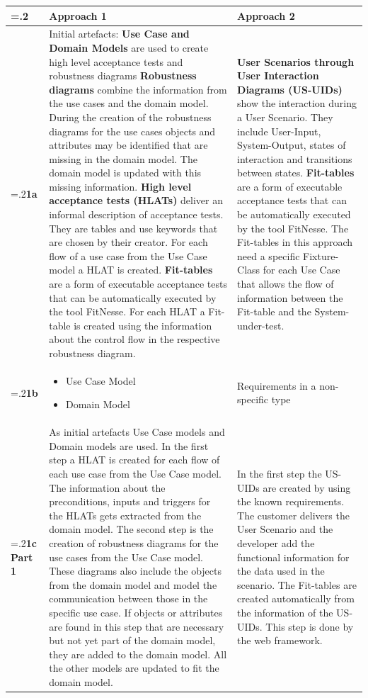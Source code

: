 	\begin{tabularx}{\textwidth}{>{\hsize=.2\hsize}X|X|X}
  		 & \textbf{Approach 1} & \textbf{Approach 2} \\
  		\hline
  		 \textbf{1a} & Initial artefacts: \textbf{Use Case and Domain Models} are used to create high level acceptance tests and robustness diagrams 
\textbf{Robustness diagrams} combine the information from the use cases and the domain model. During the creation of the robustness diagrams for the use cases objects and attributes may be identified that are missing in the domain model. The domain model is updated with this missing information.
\textbf{High level acceptance tests (HLATs)} deliver an informal description of acceptance tests. They are tables and use keywords that are chosen by their creator. For each flow of a use case from the Use Case model a HLAT is created.
\textbf{Fit-tables} are a form of executable acceptance tests that can be automatically executed by the tool FitNesse. For each HLAT a Fit-table is created using the information about the control flow in the respective robustness diagram.
 & \textbf{User Scenarios through User Interaction Diagrams (US-UIDs)} show the interaction during a User Scenario. They include User-Input, System-Output, states of interaction and transitions between states.
\textbf{Fit-tables} are a form of executable acceptance tests that can be automatically executed by the tool FitNesse. The Fit-tables in this approach need a specific Fixture-Class for each Use Case that allows the flow of information between the Fit-table and the System-under-test.
 \\
 
  		 \textbf{1b} & \begin{itemize}
  		 \item Use Case Model \item Domain Model
\end{itemize}  		  & Requirements in a non-specific type \\
  		 \textbf{1c Part 1} & As initial artefacts Use Case models and Domain models are used.
In the first step a HLAT is created for each flow of each use case from the Use Case model. The information about the preconditions, inputs and triggers for the HLATs gets extracted from the domain model.
The second step is the creation of robustness diagrams for the use cases from the Use Case model. These diagrams also include the objects from the domain model and model the communication between those in the specific use case. If objects or attributes are found in this step that are necessary but not yet part of the domain model, they are added to the domain model. All the other models are updated to fit the domain model.
 & In the first step the US-UIDs are created by using the known requirements.
The customer delivers the User Scenario and the developer add the functional information for the data used in the scenario.
The Fit-tables are created automatically from the information of the US-UIDs. This step is done by the web framework.


 \\
  		\end{tabularx}

